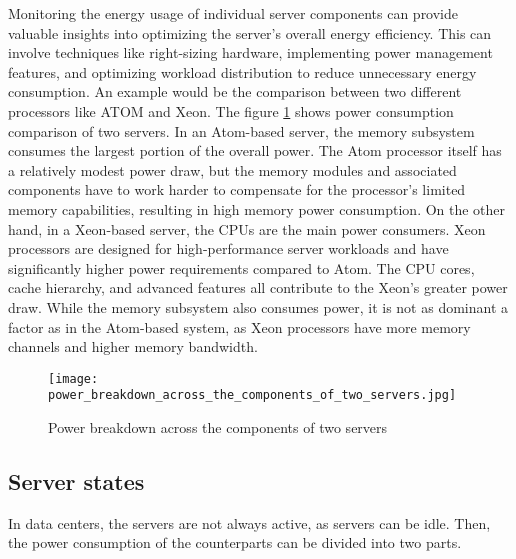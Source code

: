\documentclass[
  a4paper,  %
  twoside,  %
  bibliography=totoc,
  headsepline,
  cleardoublepage=empty,
  parskip=half,
  draft=false
]{scrbook}
\begin{document}
Monitoring the energy usage of individual server components can provide valuable insights into optimizing the server's overall energy efficiency. This can involve techniques like right-sizing hardware, implementing power management features, and optimizing workload distribution to reduce unnecessary energy consumption\cite{LIN201847}. An example would be the comparison between two different processors like ATOM and Xeon\cite{iccusaIntelAtom}. The figure \ref{servers_comparison} shows power consumption comparison of two servers.
In an Atom-based server, the memory subsystem consumes the largest portion of the overall power. The Atom processor itself has a relatively modest power draw, but the memory modules and associated components have to work harder to compensate for the processor's limited memory capabilities, resulting in high memory power consumption\cite{turley2014white}. On the other hand, in a Xeon-based server, the CPUs are the main power consumers. Xeon processors are designed for high-performance server workloads and have significantly higher power requirements compared to Atom. The CPU cores, cache hierarchy, and advanced features all contribute to the Xeon's greater power draw. While the memory subsystem also consumes power, it is not as dominant a factor as in the Atom-based system, as Xeon processors have more memory channels and higher memory bandwidth\cite{servethehomeMemoryBandwidth}.


\begin{figure}
	\centering
	\texttt{[image: power\_breakdown\_across\_the\_components\_of\_two\_servers.jpg]}
	\caption{Power breakdown across the components of two servers\cite{dayarathna2015data}}
	\label{servers_comparison}
\end{figure}



\subsection{Server states}
In data centers, the servers are not always active, as servers can be idle. Then, the power consumption of the counterparts can be divided into two parts.
\end{document}
